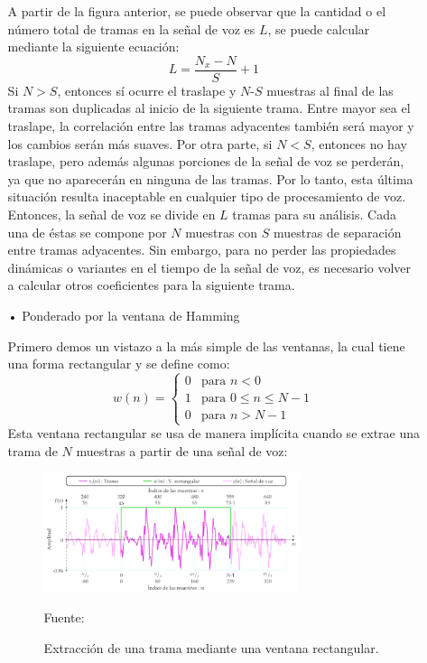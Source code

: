 \begin{enumerate}
\begin{enumerate}
A partir de la figura anterior, se puede observar que la cantidad o el número total de tramas en la señal de voz es $L$, se puede calcular mediante la siguiente ecuación:
\begin{equation}
\label{eq:ecuacion34}
L = \frac{N_{x} - N}{S} + 1
\end{equation}
Si $N>S$, entonces sí ocurre el traslape y $N \text{-} S$ muestras al final de las tramas son duplicadas al inicio de la siguiente trama. Entre mayor sea el traslape, la correlación entre las tramas adyacentes también será mayor y los cambios serán más suaves. Por otra parte, si $N < S$, entonces no hay traslape, pero además algunas porciones de la señal de voz se perderán, ya que no aparecerán en ninguna de las tramas. Por lo tanto, esta última situación resulta inaceptable en cualquier tipo de procesamiento de voz.
\vskip 0.5cm
Entonces, la señal de voz se divide en $L$ tramas para su análisis. Cada una de éstas se compone por $N$ muestras con $S$ muestras de separación entre tramas adyacentes. Sin embargo, para no perder las propiedades dinámicas o variantes en el tiempo de la señal de voz, es necesario volver a calcular otros coeficientes para la siguiente trama.

\item[•]Ponderado por la ventana de Hamming
\par
Primero demos un vistazo a la más simple de las ventanas, la cual tiene una forma rectangular y se define como:
\begin{equation}
\label{eq:ecuacion35}
%
w(n) = 
\begin{cases}
0 & \text{para $n < 0$} \\ 
1 & \text{para $0 \leq  n \leq  N-1$} \\ 
0 & \text{para $n > N-1$} 
\end{cases}
%
\end{equation}
Esta ventana rectangular se usa de manera implícita cuando se extrae una trama de $N$ muestras a partir de una señal de voz:

\newpage
\begin{figure}[ht]
\begin{center}
\includegraphics[width=0.75\textwidth]{Imagenes/Cap2/image035}
\end{center}
\begin{center}
\vskip -0.5cm
\caption{\small{Extracción de una trama mediante una ventana rectangular.}}
\label{fig:figura2.34}
{\small{Fuente: \cite{perez}}}
\end{center}
\end{figure}


\end{enumerate}
\end{enumerate}
